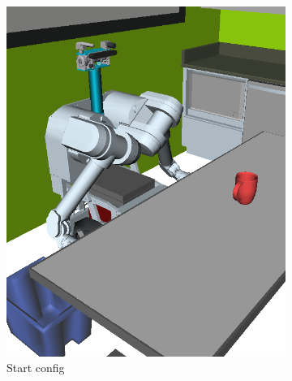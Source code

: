 {
\setlength{\offsetpage}{0.75in}
\begin{figure}
\begin{widepage}
\begin{center}

\begin{subfigure}[t]{0.19\linewidth}
\centering
\includegraphics[width=\columnwidth]{figs/testherb-a.png}
\caption{Start config}
\end{subfigure}
\begin{subfigure}[t]{0.19\linewidth}
\centering

\end{subfigure}
\end{center}
\end{widepage}
\end{figure}}
